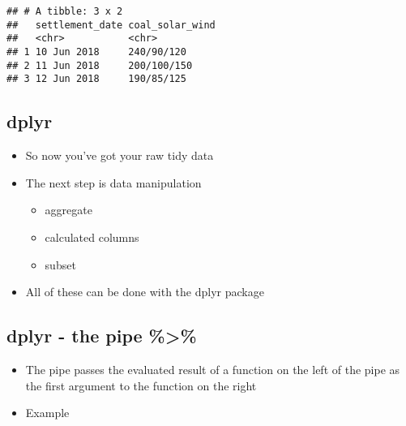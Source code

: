 \documentclass[]{article}
\newenvironment{Shaded}{\begin{snugshade}}{\end{snugshade}}
\newcommand{\KeywordTok}[1]{\textcolor[rgb]{0.13,0.29,0.53}{\textbf{#1}}}
\newcommand{\DecValTok}[1]{\textcolor[rgb]{0.00,0.00,0.81}{#1}}
\newcommand{\StringTok}[1]{\textcolor[rgb]{0.31,0.60,0.02}{#1}}
\newcommand{\OperatorTok}[1]{\textcolor[rgb]{0.81,0.36,0.00}{\textbf{#1}}}
\newcommand{\NormalTok}[1]{#1}
\providecommand{\tightlist}{%
  \setlength{\itemsep}{0pt}\setlength{\parskip}{0pt}}
\begin{document}
\begin{verbatim}
## # A tibble: 3 x 2
##   settlement_date coal_solar_wind
##   <chr>           <chr>          
## 1 10 Jun 2018     240/90/120     
## 2 11 Jun 2018     200/100/150    
## 3 12 Jun 2018     190/85/125
\end{verbatim}

\subsection{dplyr}\label{dplyr}

\begin{itemize}
\tightlist
\item
  So now you've got your raw tidy data
\item
  The next step is data manipulation

  \begin{itemize}
  \tightlist
  \item
    aggregate
  \item
    calculated columns
  \item
    subset
  \end{itemize}
\item
  All of these can be done with the dplyr package
\end{itemize}

\subsection{dplyr - the pipe \%\textgreater{}\%}\label{dplyr---the-pipe}

\begin{itemize}
\tightlist
\item
  The pipe passes the evaluated result of a function on the left of the
  pipe as the first argument to the function on the right
\item
  Example
\end{itemize}

\begin{Shaded}
\end{Shaded}
\end{document}
